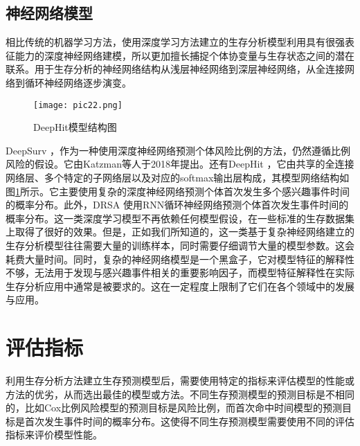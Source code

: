 \subsection{神经网络模型}

相比传统的机器学习方法，使用深度学习方法建立的生存分析模型利用具有很强表征能力的深度神经网络建模，所以更加擅长捕捉个体协变量与生存状态之间的潜在联系。用于生存分析的神经网络结构从浅层神经网络到深层神经网络，从全连接网络到循环神经网络逐步演变。

\begin{figure}[H]
\texttt{[image: pic22.png]}
\caption{DeepHit模型结构图}
\label{pic22}
\end{figure}

DeepSurv ，作为一种使用深度神经网络预测个体风险比例的方法，仍然遵循比例风险的假设。它由Katzman等人于2018年提出。还有DeepHit ，它由共享的全连接网络层、多个特定的子网络层以及对应的softmax输出层构成，其模型网络结构如图\ref{pic22}所示。它主要使用复杂的深度神经网络预测个体首次发生多个感兴趣事件时间的概率分布。此外，DRSA 使用RNN循环神经网络预测个体首次发生事件时间的概率分布。这一类深度学习模型不再依赖任何模型假设，在一些标准的生存数据集上取得了很好的效果。但是，正如我们所知道的，这一类基于复杂神经网络建立的生存分析模型往往需要大量的训练样本，同时需要仔细调节大量的模型参数。这会耗费大量时间。同时，复杂的神经网络模型是一个黑盒子，它对模型特征的解释性不够，无法用于发现与感兴趣事件相关的重要影响因子，而模型特征解释性在实际生存分析应用中通常是被要求的。这在一定程度上限制了它们在各个领域中的发展与应用。

\section{评估指标}

利用生存分析方法建立生存预测模型后，需要使用特定的指标来评估模型的性能或方法的优劣，从而选出最佳的模型或方法。不同生存预测模型的预测目标是不相同的，比如Cox比例风险模型的预测目标是风险比例，而首次命中时间模型的预测目标是首次发生事件时间的概率分布。这使得不同生存预测模型需要使用不同的评估指标来评价模型性能。

